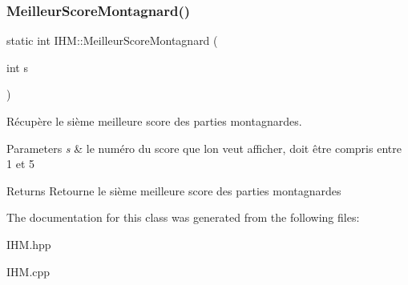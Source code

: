 \subsubsection{\texorpdfstring{Meilleur\+Score\+Montagnard()}{MeilleurScoreMontagnard()}}
{\footnotesize\ttfamily static int I\+H\+M\+::\+Meilleur\+Score\+Montagnard (\begin{DoxyParamCaption}\item[{int}]{s }\end{DoxyParamCaption})\hspace{0.3cm}{\ttfamily [static]}}



Récupère le sième meilleure score des parties montagnardes. 


\begin{DoxyParams}{Parameters}
{\em s} & le numéro du score que l\textquotesingle{}on veut afficher, doit être compris entre 1 et 5 \\
\hline
\end{DoxyParams}
\begin{DoxyReturn}{Returns}
Retourne le sième meilleure score des parties montagnardes 
\end{DoxyReturn}


The documentation for this class was generated from the following files\+:\begin{DoxyCompactItemize}
\item 
I\+H\+M.\+hpp\item 
I\+H\+M.\+cpp\end{DoxyCompactItemize}

